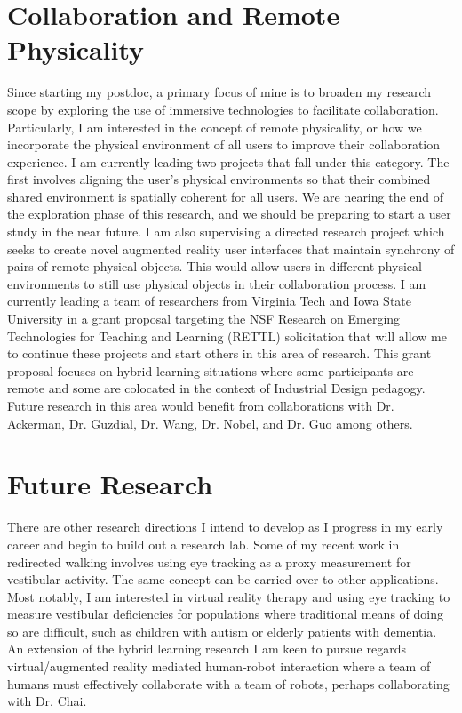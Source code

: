 \section*{Collaboration and Remote Physicality}
\vspace{-0.5cm}
Since starting my postdoc, a primary focus of mine is to broaden my research scope by exploring the use of immersive technologies to facilitate collaboration. Particularly, I am interested in the concept of remote physicality, or how we incorporate the physical environment of all users to improve their collaboration experience. I am currently leading two projects that fall under this category. The first involves aligning the user's physical environments so that their combined shared environment is spatially coherent for all users. We are nearing the end of the exploration phase of this research, and we should be preparing to start a user study in the near future. I am also supervising a directed research project which seeks to create novel augmented reality user interfaces that maintain synchrony of pairs of remote physical objects. This would allow users in different physical environments to still use physical objects in their collaboration process. I am currently leading a team of researchers from Virginia Tech and Iowa State University in a grant proposal targeting the NSF Research on Emerging Technologies for Teaching and Learning (RETTL) solicitation that will allow me to continue these projects and start others in this area of research. This grant proposal focuses on hybrid learning situations where some participants are remote and some are colocated in the context of Industrial Design pedagogy. Future research in this area would benefit from collaborations with Dr. Ackerman, Dr. Guzdial, Dr. Wang, Dr. Nobel, and Dr. Guo among others.

\section*{Future Research}
There are other research directions I intend to develop as I progress in my early career and begin to build out a research lab. Some of my recent work in redirected walking involves using eye tracking as a proxy measurement for vestibular activity. The same concept can be carried over to other applications. Most notably, I am interested in virtual reality therapy and using eye tracking to measure vestibular deficiencies for populations where traditional means of doing so are difficult, such as children with autism or elderly patients with dementia. An extension of the hybrid learning research I am keen to pursue regards virtual/augmented reality mediated human‐robot interaction where a team of humans must effectively collaborate with a team of robots, perhaps collaborating with Dr. Chai.




\label{research_last}
